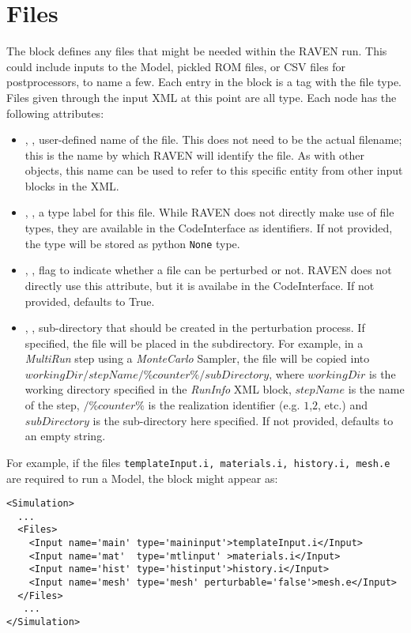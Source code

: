\section{Files}
\label{sec:files}

The  block defines any files that might be needed within
the RAVEN run.  This could include inputs to the Model, pickled ROM files,
or CSV files for postprocessors, to name a few.
%
Each entry in the  block is a tag with the file type.  Files
given through the input XML at this point are all  type.
Each  node has the following attributes:
\vspace{-5mm}
\begin{itemize}
  \itemsep0em
  \item {}, , user-defined name
  of the file.  This does not need to be the actual filename; this is the name
  by which RAVEN will identify the file.
  \nb As with other objects, this name can be used to refer to this
  specific entity from other input blocks in the XML.
  \item {}, , a type label
  for this file.  While RAVEN does not directly make use of file types,
  they are available in the CodeInterface as identifiers.  If not provided,
  the type will be stored as python \texttt{None} type.

  \item {}, , flag
  to indicate whether a file can be perturbed or not. RAVEN does not
  directly use this attribute, but it is availabe in the CodeInterface.
  If not provided, defaults to True.
  
  \item {}, , sub-directory
  that should be created in the perturbation process. If specified, the file will be
  placed in the subdirectory. For example, in a \textit{MultiRun} step using a \textit{MonteCarlo}
  Sampler, the file will be copied into \\$workingDir/stepName/\%counter\%/subDirectory$, where $workingDir$
  is the working directory specified in the \textit{RunInfo} XML block, $stepName$ is the name of the step, 
  $/\%counter\%$ is the realization identifier (e.g. $1$,$2$, etc.) and $subDirectory$ is the sub-directory here
  specified.
  If not provided, defaults to an empty string.
\end{itemize}
\vspace{-5mm}
For example, if the files \texttt{templateInput.i, materials.i, history.i, mesh.e}
 are required to run a Model, the  block might appear as:
\begin{lstlisting}[style=XML,morekeywords={name,file}] %moreemph={name,file}]
<Simulation>
  ...
  <Files>
    <Input name='main' type='maininput'>templateInput.i</Input>
    <Input name='mat'  type='mtlinput' >materials.i</Input>
    <Input name='hist' type='histinput'>history.i</Input>
    <Input name='mesh' type='mesh' perturbable='false'>mesh.e</Input>
  </Files>
   ...
</Simulation>
\end{lstlisting}
